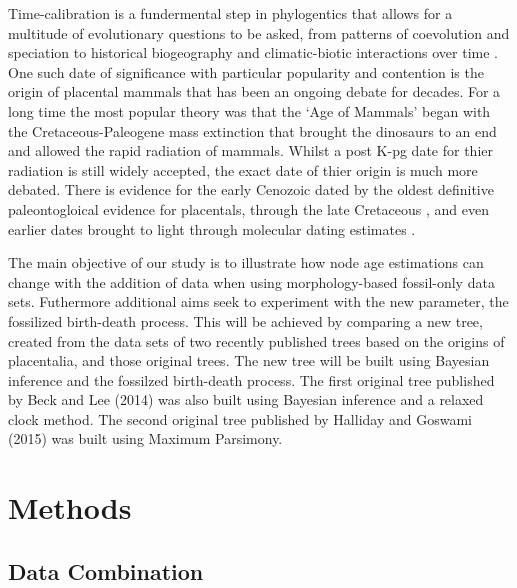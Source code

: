 \documentclass[11pt,letterpaper]{article}
\begin{document}
Time-calibration is a fundermental step in phylogentics that allows for a multitude of evolutionary questions to be asked, from patterns of coevolution and speciation to historical biogeography and climatic-biotic interactions over time \citep{heath2014fossilized}. One such date of significance with particular popularity and contention is the origin of placental mammals that has been an ongoing debate for decades. For a long time the most popular theory was that the `Age of Mammals' began with the Cretaceous-Paleogene mass extinction that brought the dinosaurs to an end and allowed the rapid radiation of mammals. Whilst a post K-pg date for thier radiation is still widely accepted, the exact date of thier origin is much more debated. There is evidence for the early Cenozoic \citep{wible2007cretaceous} dated by the oldest definitive paleontogloical evidence for placentals, through the late Cretaceous \citep{archibald2011protungulatum}, \citep{hooker2014new} and even earlier dates brought to light through molecular dating estimates \citep{dos2012phylogenomic}.   

The main objective of our study is to illustrate how node age estimations can change with the addition of data when using morphology-based fossil-only data sets. Futhermore additional aims seek to experiment with the new parameter, the fossilized birth-death process. This will be achieved by comparing a new tree, created from the data sets of two recently published trees based on the origins of placentalia, and those original trees. The new tree will be built using Bayesian inference and the fossilzed birth-death process. The first original tree published by Beck and Lee (2014) was also built using Bayesian inference and a relaxed clock method. The second original tree published by Halliday and Goswami (2015) was built using Maximum Parsimony.

\newpage

\section{Methods}

\subsection{Data Combination}
\end{document}
